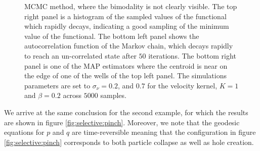 \documentclass[runningheads]{llncs}
\begin{document}
\begin{figure}[h!]
{    MCMC method, where the bimodality is not clearly visible.  The top right
    panel is a histogram of the sampled
    values of the functional which rapidly decays, indicating a good sampling of
    the minimum value of the functional.  The bottom left panel shows the
    autocorrelation function of the Markov chain, which decays rapidly to reach
    an un-correlated state after $50$ iterations.  The bottom right panel is one
    of the MAP estimators where the centroid is near on the edge of one of the
    wells of the top left panel.  The simulations parameters are set to
    $\sigma_\nu = 0.2$, and $0.7$ for the velocity kernel, $K=1$ and $\beta=0.2$
    across $5000$ samples.}
    \label{fig:selective:crisscross}
\end{figure}

We arrive at the same conclusion for the second example, for which the results
are shown in figure \eqref{fig:selective:pinch}. Moreover, we note that the
geodesic equations for $p$ and $q$ are time-reversible meaning that the
configuration in figure \ref{fig:selective:pinch} corresponds to both particle
collapse as well as hole creation. 
\end{document}
